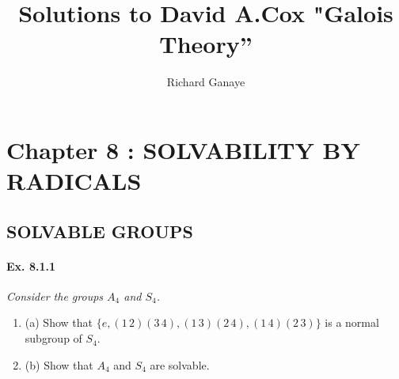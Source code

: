 \documentclass[11pt,a4paper]{article}
\title{Solutions to David A.Cox  "Galois Theory''}
\author{Richard Ganaye}
\newcommand{\be} {\begin{enumerate}}
\newcommand{\ee} {\end{enumerate}}
\begin{document}
\maketitle

\section{Chapter 8 : SOLVABILITY BY RADICALS}

\subsection{SOLVABLE GROUPS}
\paragraph{Ex. 8.1.1}

{\it Consider the groups $A_4$ and $S_4$.
\be
\item[(a)] Show that $\{e,(1\, 2)(3\, 4), (1\, 3)(2\, 4), (1\, 4)(2\, 3)\}$ is a normal subgroup of $S_4$.
\item[(b)] Show that $A_4$ and $S_4$ are solvable.
\ee
}
\end{document}
